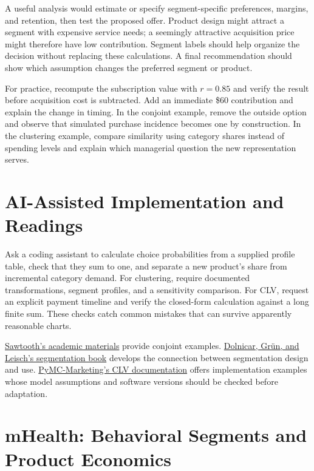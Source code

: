 A useful analysis would estimate or specify segment-specific
preferences, margins, and retention, then test the proposed offer.
Product design might attract a segment with expensive service needs; a
seemingly attractive acquisition price might therefore have low
contribution. Segment labels should help organize the decision without
replacing these calculations. A final recommendation should show which
assumption changes the preferred segment or product.

For practice, recompute the subscription value with \(r=0.85\) and
verify the result before acquisition cost is subtracted. Add an
immediate \$60 contribution and explain the change in timing. In the
conjoint example, remove the outside option and observe that simulated
purchase incidence becomes one by construction. In the clustering
example, compare similarity using category shares instead of spending
levels and explain which managerial question the new representation
serves.

\hypertarget{M04-ai-assisted-implementation-and-readings}{%
\section{AI-Assisted Implementation and
Readings}\label{M04-ai-assisted-implementation-and-readings}}

\noindent Ask a coding assistant to calculate choice probabilities from a supplied
profile table, check that they sum to one, and separate a new product's
share from incremental category demand. For clustering, require
documented transformations, segment profiles, and a sensitivity
comparison. For CLV, request an explicit payment timeline and verify the
closed-form calculation against a long finite sum. These checks catch
common mistakes that can survive apparently reasonable charts.

\href{https://sawtoothsoftware.com/academics/teaching-resources}{Sawtooth's
academic materials} provide conjoint examples.
\href{https://link.springer.com/book/10.1007/978-981-10-8818-6}{Dolnicar,
Grün, and Leisch's segmentation book} develops the connection between
segmentation design and use.
\href{https://www.pymc-marketing.io/en/latest/notebooks/clv/clv_quickstart.html}{PyMC-Marketing's
CLV documentation} offers implementation examples whose model
assumptions and software versions should be checked before adaptation.

\hypertarget{M04-mhealth-behavioral-segments-and-product-economics}{%
\section{mHealth: Behavioral Segments and Product
Economics}\label{M04-mhealth-behavioral-segments-and-product-economics}}

